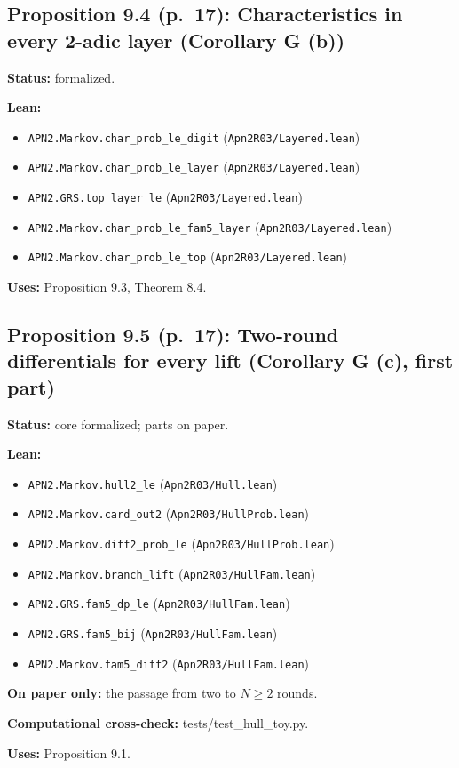 \documentclass[11pt]{article}
\begin{document}
\subsection*{Proposition 9.4 (p.~17): Characteristics in every 2-adic layer (Corollary G (b))}
\textbf{Status:} formalized.\par
\textbf{Lean:}\begin{itemize}\setlength\itemsep{0pt}
\item \texttt{APN2.Markov.char\_prob\_le\_digit} \hfill (\texttt{Apn2R03/Layered.lean})
\item \texttt{APN2.Markov.char\_prob\_le\_layer} \hfill (\texttt{Apn2R03/Layered.lean})
\item \texttt{APN2.GRS.top\_layer\_le} \hfill (\texttt{Apn2R03/Layered.lean})
\item \texttt{APN2.Markov.char\_prob\_le\_fam5\_layer} \hfill (\texttt{Apn2R03/Layered.lean})
\item \texttt{APN2.Markov.char\_prob\_le\_top} \hfill (\texttt{Apn2R03/Layered.lean})
\end{itemize}
\textbf{Uses:} Proposition 9.3, Theorem 8.4.\par
\subsection*{Proposition 9.5 (p.~17): Two-round differentials for every lift (Corollary G (c), first part)}
\textbf{Status:} core formalized; parts on paper.\par
\textbf{Lean:}\begin{itemize}\setlength\itemsep{0pt}
\item \texttt{APN2.Markov.hull2\_le} \hfill (\texttt{Apn2R03/Hull.lean})
\item \texttt{APN2.Markov.card\_out2} \hfill (\texttt{Apn2R03/HullProb.lean})
\item \texttt{APN2.Markov.diff2\_prob\_le} \hfill (\texttt{Apn2R03/HullProb.lean})
\item \texttt{APN2.Markov.branch\_lift} \hfill (\texttt{Apn2R03/HullFam.lean})
\item \texttt{APN2.GRS.fam5\_dp\_le} \hfill (\texttt{Apn2R03/HullFam.lean})
\item \texttt{APN2.GRS.fam5\_bij} \hfill (\texttt{Apn2R03/HullFam.lean})
\item \texttt{APN2.Markov.fam5\_diff2} \hfill (\texttt{Apn2R03/HullFam.lean})
\end{itemize}
\textbf{On paper only:} the passage from two to $N\ge2$ rounds.\par
\textbf{Computational cross-check:} tests/test\_hull\_toy.py.\par
\textbf{Uses:} Proposition 9.1.\par
\end{document}
